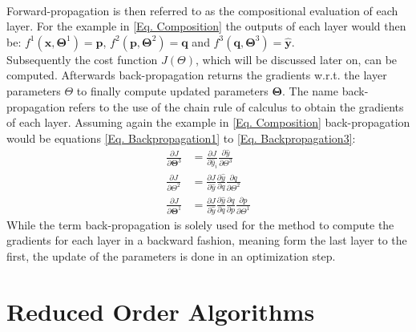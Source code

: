 \documentclass[12pt, a4paper]{article}
\begin{document}
\\
\noindent
Forward-propagation is then referred to as the compositional evaluation of each layer. For the example in \cref{Eq. Composition} the outputs of each layer would then be:  \(f^1(\mathbf{x},\mathbf{\Theta}^1) = \mathbf{p}\), \(f^2(\mathbf{p},\mathbf{\Theta}^2) = \mathbf{q}\) and \(f^3(\mathbf{q},\mathbf{\Theta}^3) = \mathbf{\hat{y}}\).\\
Subsequently the cost function \(J(\Theta)\), which will be discussed later on, can be computed. Afterwards back-propagation returns the gradients w.r.t. the layer parameters \(\Theta\) to finally compute updated parameters \(\mathbf{\Theta}\).  The name back-propagation refers to the use of the chain rule of calculus to obtain the gradients of each layer. Assuming again the example in \cref{Eq. Composition} back-propagation would be equations \cref{Eq. Backpropagation1} to \cref{Eq. Backpropagation3}:
\begin{align}
	\frac{\partial J}{\partial \mathbf{\Theta}^3} &= \frac{\partial J}{\partial\hat{y}_i}\frac{\partial\hat{y}}{\partial \Theta^3}
\label{Eq. Backpropagation3}\\
	\frac{\partial J}{\partial \Theta^2} &= \frac{\partial J}{\partial\hat{y}}\frac{\partial\hat{y}}{\partial q}\frac{\partial q}{\partial \Theta^2}
\label{Eq. Backpropagation2}\\
	\frac{\partial J}{\partial \mathbf{\Theta}^1} &= \frac{\partial J}{\partial\hat{y}}\frac{\partial\hat{y}}{\partial q}\frac{\partial q}{\partial p}\frac{\partial p}{\partial \Theta^1}
\label{Eq. Backpropagation1}
\end{align}
While the term back-propagation is solely used for the method to compute the gradients for each layer in a backward fashion, meaning form the last layer to the first, the update of the parameters is done in an optimization step.
\section{Reduced Order Algorithms}
\end{document}
